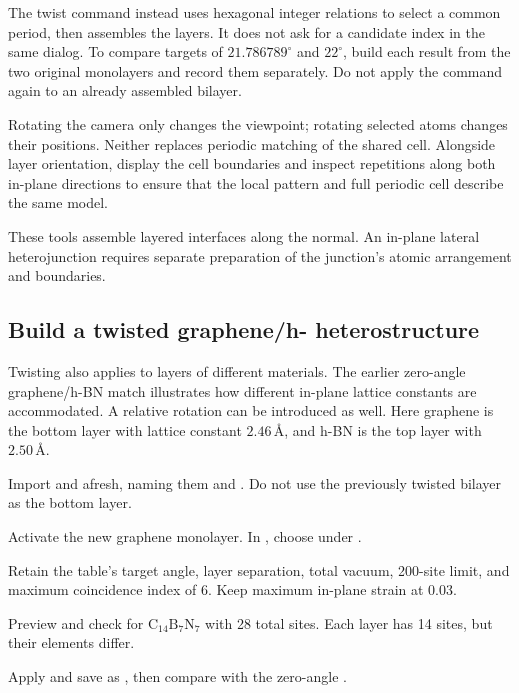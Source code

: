 The twist command instead uses hexagonal integer relations to select a common period, then assembles the layers. It does not ask for a candidate index in the same dialog. To compare targets of $21.786789^\circ$ and $22^\circ$, build each result from the two original monolayers and record them separately. Do not apply the command again to an already assembled bilayer.

Rotating the camera only changes the viewpoint; rotating selected atoms changes their positions. Neither replaces periodic matching of the shared cell. Alongside layer orientation, display the cell boundaries and inspect repetitions along both in-plane directions to ensure that the local pattern and full periodic cell describe the same model.

These tools assemble layered interfaces along the normal. An in-plane lateral heterojunction requires separate preparation of the junction's atomic arrangement and boundaries.

\subsection{Build a twisted graphene/h- heterostructure}

Twisting also applies to layers of different materials. The earlier zero-angle graphene/h-BN match illustrates how different in-plane lattice constants are accommodated. A relative rotation can be introduced as well. Here graphene is the bottom layer with lattice constant $2.46\,\text{\AA}$, and h-BN is the top layer with $2.50\,\text{\AA}$.

\begin{steps}
  \item Import  and  afresh, naming them  and . Do not use the previously twisted bilayer as the bottom layer.
  \item Activate the new graphene monolayer. In , choose  under .
  \item Retain the table's target angle, layer separation, total vacuum, 200-site limit, and maximum coincidence index of 6. Keep maximum in-plane strain at 0.03.
  \item Preview and check for $\mathrm{C_{14}B_7N_7}$ with 28 total sites. Each layer has 14 sites, but their elements differ.
  \item Apply and save as , then compare with the zero-angle .
\end{steps}

